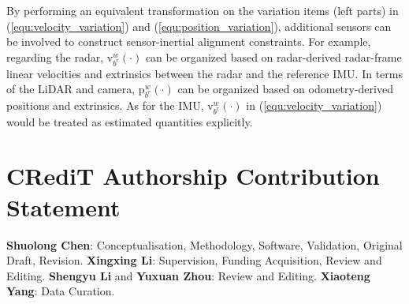 \documentclass[lettersize,journal,twoside]{IEEEtran}
\newcommand\bsm[1]{\boldsymbol{\mathrm{#1}}}
\newcommand\translation[2]{{\bsm{p}_{#1}^{#2}}}
\newcommand\linvel[2]{{\bsm{v}_{#1}^{#2}}}
\begin{document}
By performing an equivalent transformation on the variation items (left parts) in (\ref{equ:velocity_variation}) and (\ref{equ:position_variation}), additional sensors can be involved to construct sensor-inertial alignment constraints.
For example, regarding the radar, $\linvel{b^r}{w}(\cdot)$ can be organized based on radar-derived radar-frame linear velocities and extrinsics between the radar and the reference IMU.
In terms of the LiDAR and camera, $\translation{b^r}{w}(\cdot)$ can be organized based on odometry-derived positions and extrinsics.
As for the IMU, $\linvel{b^r}{w}(\cdot)$ in (\ref{equ:velocity_variation}) would be treated as estimated quantities explicitly.


\section*{CRediT Authorship Contribution Statement}
\textbf{Shuolong Chen}: Conceptualisation, Methodology, Software, Validation, Original Draft, Revision.
\textbf{Xingxing Li}: Supervision, Funding Acquisition, Review and Editing.
\textbf{Shengyu Li} and \textbf{Yuxuan Zhou}: Review and Editing.
\textbf{Xiaoteng Yang}: Data Curation.
		
\end{document}

